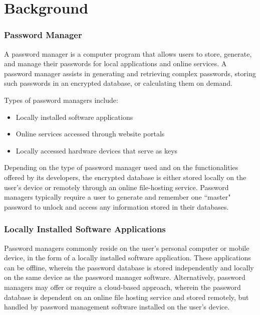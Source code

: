 \chapter{Background}
\label{sec:background}

\subsection{Password Manager}

A password manager is a computer program that allows users to store, generate, and manage their passwords for local applications and online services.
A password manager assists in generating and retrieving complex passwords, storing such passwords in an encrypted database, or calculating them on demand.

Types of password managers include:

\begin{itemize}
    \item Locally installed software applications
    \item Online services accessed through website portals
    \item Locally accessed hardware devices that serve as keys
\end{itemize}

Depending on the type of password manager used and on the functionalities offered by its developers, the encrypted database is either stored locally on the user's device or remotely through an online file-hosting service. Password managers typically require a user to generate and remember one ``master" password to unlock and access any information stored in their databases.

\subsection{Locally Installed Software Applications}

Password managers commonly reside on the user's personal computer or mobile device, in the form of a locally installed software application. These applications can be offline, wherein the password database is stored independently and locally on the same device as the password manager software. Alternatively, password managers may offer or require a cloud-based approach, wherein the password database is dependent on an online file hosting service and stored remotely, but handled by password management software installed on the user's device.

